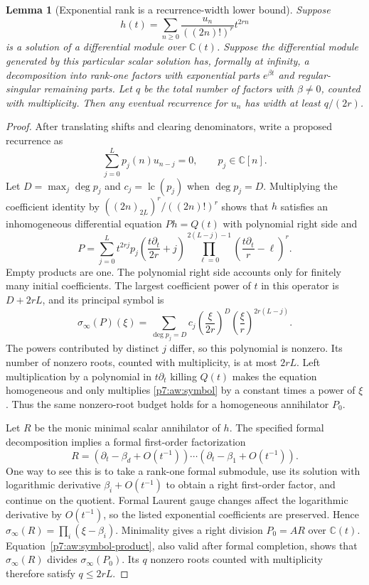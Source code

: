 \documentclass[11pt,a4paper]{article}
\newtheorem{lemma}[theorem]{Lemma}
\theoremstyle{definition}
\theoremstyle{remark}
\numberwithin{equation}{section}
\begin{document}
\begin{lemma}[Exponential rank is a recurrence-width lower bound]
\label{p7:aw:budget}
Suppose
\[
 h(t)=\sum_{n\ge0}\frac{u_n}{((2n)!)^r}t^{2rn}
\]
is a solution of a differential module over $\mathbb C(t)$.
Suppose the differential module generated by this particular scalar
solution has, formally at infinity, a decomposition into rank-one
factors with exponential parts $e^{\beta t}$ and regular-singular
remaining parts. Let $q$ be the total number of factors with
$\beta\ne0$, counted with multiplicity. Then any eventual recurrence
for $u_n$ has width at least $q/(2r)$.
\end{lemma}
\begin{proof}
After translating shifts and clearing denominators, write a proposed
recurrence as
\[
 \sum_{j=0}^L p_j(n)u_{n-j}=0,\qquad p_j\in\mathbb C[n].
\]
Let $D=\max_j\deg p_j$ and $c_j=\operatorname{lc}(p_j)$ when
$\deg p_j=D$. Multiplying the coefficient identity by
$((2n)_{\underline{2L}})^r/((2n)!)^r$ shows that $h$ satisfies an
inhomogeneous differential equation $Ph=Q(t)$ with polynomial right
side and
\[
 P=\sum_{j=0}^L t^{2rj}
 p_j\left(\frac{t\partial_t}{2r}+j\right)
 \prod_{\ell=0}^{2(L-j)-1}
       \left(\frac{t\partial_t}{r}-\ell\right)^r.
\]
Empty products are one. The polynomial right side accounts only for
finitely many initial coefficients. The largest coefficient power
of $t$ in this operator is $D+2rL$, and its principal symbol is
\begin{equation}\label{p7:aw:symbol}
 \sigma_\infty(P)(\xi)
 =\sum_{\deg p_j=D}c_j
       \left(\frac\xi{2r}\right)^D
       \left(\frac\xi r\right)^{2r(L-j)}.
\end{equation}
The powers contributed by distinct $j$ differ, so this polynomial
is nonzero. Its number of nonzero roots, counted with multiplicity,
is at most $2rL$. Left multiplication by a polynomial in
$t\partial_t$ killing $Q(t)$ makes the equation homogeneous and
only multiplies \eqref{p7:aw:symbol} by a constant times a power of
$\xi$. Thus the same nonzero-root budget holds for a homogeneous
annihilator $P_0$.

Let $R$ be the monic minimal scalar annihilator of $h$. The specified
formal decomposition implies a formal first-order factorization
\[
 R=(\partial_t-\beta_d+O(t^{-1}))\cdots
   (\partial_t-\beta_1+O(t^{-1})).
\]
One way to see this is to take a rank-one formal submodule, use its
solution with logarithmic derivative $\beta_i+O(t^{-1})$ to obtain
a right first-order factor, and continue on the quotient. Formal
Laurent gauge changes affect the logarithmic derivative by
$O(t^{-1})$, so the listed exponential coefficients are preserved.
Hence $\sigma_\infty(R)=\prod_i(\xi-\beta_i)$.
Minimality gives a right division $P_0=AR$ over $\mathbb C(t)$.
Equation~\eqref{p7:aw:symbol-product}, also valid after formal completion,
shows that $\sigma_\infty(R)$ divides $\sigma_\infty(P_0)$.
Its $q$ nonzero roots counted with multiplicity therefore satisfy
$q\le2rL$.
\end{proof}
\end{document}
